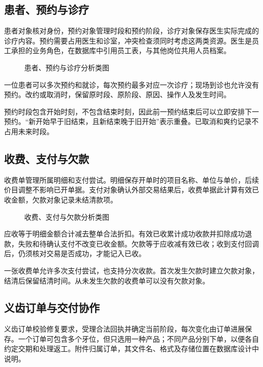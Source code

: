\clearpage
\subsection{患者、预约与诊疗}
患者对象核对身份，预约对象管理时段和预约阶段，诊疗对象保存医生实际完成的诊疗内容。预约需要占用医生和诊室，冲突检查须同时考虑这两类资源。医生是员工承担的业务角色，在数据库中引用员工表，与其他岗位共用人员档案。

\begin{figure}[H]\centering
{}
\caption{患者、预约与诊疗分析类图}\label{fig:analysis-appointment}
\end{figure}

一位患者可以多次预约和就诊，每次预约最多对应一次诊疗；现场到诊也允许没有预约。改约或取消时，保留原时段、原阶段、原因、操作人及发生时间。

预约时段包含开始时刻，不包含结束时刻，因此前一预约结束后可以立即安排下一预约。“新开始早于旧结束，且新结束晚于旧开始”表示重叠。已取消和爽约记录不占用未来时段。

\clearpage
\subsection{收费、支付与欠款}
收费单管理所属明细和支付尝试。明细保存开单时的项目名称、单位与单价，后续价目调整不影响已开单据。支付对象确认外部交易结果后，收费单据此计算有效已收金额，欠款对象记录未结清款项。

\begin{figure}[H]\centering
{}
\caption{收费、支付与欠款分析类图}\label{fig:analysis-billing}
\end{figure}

应收等于明细金额合计减去整单合法折扣。有效已收累计成功收款并扣除成功退款，失败和待确认支付不改变已收金额。欠款等于应收减有效已收；收到支付回调后，仍须核对交易是否成功，才能记入已收。

一张收费单允许多次支付尝试，也支持分次收款。首次发生欠款时建立欠款对象，结清后保留结清时间。从未发生欠款的收费单可以没有欠款对象。

\clearpage
\subsection{义齿订单与交付协作}
义齿订单校验修复要求，受理合法回执并确定当前阶段，每次变化由订单进展保存。一个订单可包含多个牙位，但只选用一种产品；不同产品分别下单，以便各自约定交期和处理返工。附件归属订单，其文件名、格式及存储位置在数据库设计中说明。

